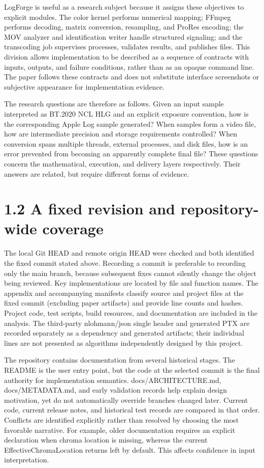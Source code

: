 \documentclass[11pt,a4paper,openany]{book}
\begin{document}
LogForge is useful as a research subject because it assigns these objectives to explicit modules. The color kernel performs numerical mapping; FFmpeg performs decoding, matrix conversion, resampling, and ProRes encoding; the MOV analyzer and identification writer handle structured signaling; and the transcoding job supervises processes, validates results, and publishes files. This division allows implementation to be described as a sequence of contracts with inputs, outputs, and failure conditions, rather than as an opaque command line. The paper follows these contracts and does not substitute interface screenshots or subjective appearance for implementation evidence.

The research questions are therefore as follows. Given an input sample interpreted as BT.2020 NCL HLG and an explicit exposure convention, how is the corresponding Apple Log sample generated? When samples form a video file, how are intermediate precision and storage requirements controlled? When conversion spans multiple threads, external processes, and disk files, how is an error prevented from becoming an apparently complete final file? These questions concern the mathematical, execution, and delivery layers respectively. Their answers are related, but require different forms of evidence.


\section*{1.2 A fixed revision and repository-wide coverage}
The local Git HEAD and remote origin HEAD were checked and both identified the fixed commit stated above. Recording a commit is preferable to recording only the main branch, because subsequent fixes cannot silently change the object being reviewed. Key implementations are located by file and function names. The appendix and accompanying manifests classify source and project files at the fixed commit (excluding paper artifacts) and provide line counts and hashes. Project code, test scripts, build resources, and documentation are included in the analysis. The third-party nlohmann/json single header and generated PTX are recorded separately as a dependency and generated artifacts; their individual lines are not presented as algorithms independently designed by this project.

The repository contains documentation from several historical stages. The README is the user entry point, but the code at the selected commit is the final authority for implementation semantics. docs/ARCHITECTURE.md, docs/METADATA.md, and early validation records help explain design motivation, yet do not automatically override branches changed later. Current code, current release notes, and historical test records are compared in that order. Conflicts are identified explicitly rather than resolved by choosing the most favorable narrative. For example, older documentation requires an explicit declaration when chroma location is missing, whereas the current EffectiveChromaLocation returns left by default. This affects confidence in input interpretation.
\end{document}
